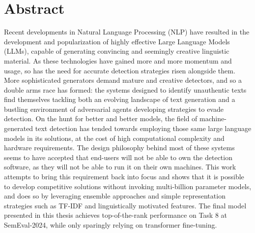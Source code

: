 \section*{Abstract}

Recent developments in Natural Language Processing (NLP) have resulted in the development and popularization of highly effective Large Language Models (LLMs), capable of generating convincing and seemingly creative linguistic material.
As these technologies have gained more and more momentum and usage, so has the need for accurate detection strategies risen alongside them.
More sophisticated generators demand mature and creative detectors, and so a double arms race has formed: the systems designed to identify unauthentic texts find themselves tackling both an evolving landscape of text generation and a bustling environment of adversarial agents developing strategies to evade detection.
On the hunt for better and better models, the field of machine-generated text detection has tended towards employing those same large language models in its solutions, at the cost of high computational complexity and hardware requirements.
The design philosophy behind most of these systems seems to have accepted that end-users will not be able to own the detection software, as they will not be able to run it on their own machines.
This work attempts to bring this requirement back into focus and shows that it is possible to develop competitive solutions without invoking multi-billion parameter models, and does so by leveraging ensemble approaches and simple representation strategies such as TF-IDF and linguistically motivated features.
The final model presented in this thesis achieves top-of-the-rank performance on Task 8 at SemEval-2024, while only sparingly relying on transformer fine-tuning.